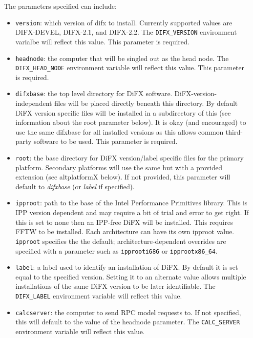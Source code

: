 The parameters specified can include:

\begin{itemize}
\item {\tt version}: which version of difx to install.
Currently supported values are DIFX-DEVEL, DIFX-2.1, and DIFX-2.2.
The {\tt DIFX\_VERSION} environment varialbe will reflect this value.
This parameter is required.

\item {\tt headnode}: the computer that will be singled out as the head node.
The {\tt DIFX\_HEAD\_NODE} environment variable will reflect this value.
This parameter is required.

\item {\tt difxbase}: the top level directory for DiFX software.
DiFX-version-independent files will be placed directly beneath this directory.
By default DiFX version specific files will be installed in a subdirectory of this (see information about the root parameter below).
It is okay (and encouraged) to use the same difxbase for all installed versions as this allows common third-party software to be used.
This parameter is required.

\item {\tt root}: the base directory for DiFX version/label specific files for the primary platform.
Secondary platforms will use the same but with a provided extension (see altplatformX below).
If not provided, this parameter will default to {\em difxbase} (or {\em label} if specified).

\item {\tt ipproot}: path to the base of the Intel Performance Primitives library.
This is IPP version dependent and may require a bit of trial and error to get right.
If this is set to  none  then an IPP-free DiFX will be installed.
This requires FFTW to be installed.
Each architecture can have its own ipproot value.
{\tt ipproot} specifies the the default; architecture-dependent overrides are specified with a parameter such as {\tt ipprooti686} or {\tt ipprootx86\_64}.

\item {\tt label}: a label used to identify an installation of DiFX.
By default it is set equal to the specified version.
Setting it to an alternate value allows multiple installations of the same DiFX version to be later identifiable.
The {\tt DIFX\_LABEL} environment variable will reflect this value.

\item {\tt calcserver}: the computer to send RPC model requests to.
If not specified, this will default to the value of the headnode parameter.
The {\tt CALC\_SERVER} environment variable will reflect this value.


\end{itemize}
